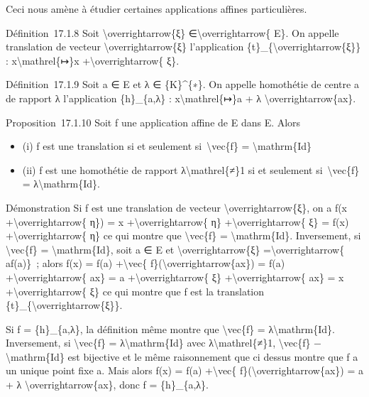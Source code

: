 \documentclass[]{article}
\begin{document}
Ceci nous amène à étudier certaines applications affines particulières.

Définition~17.1.8 Soit \textbackslash{}overrightarrow\{ξ\}
∈\textbackslash{}overrightarrow\{ E\}. On appelle translation de vecteur
\textbackslash{}overrightarrow\{ξ\} l'application
\{t\}\_\{\textbackslash{}overrightarrow\{ξ\}\} :
x\textbackslash{}mathrel\{↦\}x +\textbackslash{}overrightarrow\{ ξ\}.

Définition~17.1.9 Soit a ∈ E et λ ∈ \{K\}\^{}\{∗\}. On appelle
homothétie de centre a de rapport λ l'application \{h\}\_\{a,λ\} :
x\textbackslash{}mathrel\{↦\}a + λ \textbackslash{}overrightarrow\{ax\}.

Proposition~17.1.10 Soit f une application affine de E dans E. Alors

\begin{itemize}
\itemsep1pt\parskip0pt
\item
  (i) f est une translation si et seulement si~\textbackslash{}vec\{f\}
  = \textbackslash{}mathrm\{Id\}
\item
  (ii) f est une homothétie de rapport λ\textbackslash{}mathrel\{≠\}1 si
  et seulement si~\textbackslash{}vec\{f\} =
  λ\textbackslash{}mathrm\{Id\}.
\end{itemize}

Démonstration Si f est une translation de vecteur
\textbackslash{}overrightarrow\{ξ\}, on a f(x
+\textbackslash{}overrightarrow\{ η\}) = x
+\textbackslash{}overrightarrow\{ η\} +\textbackslash{}overrightarrow\{
ξ\} = f(x) +\textbackslash{}overrightarrow\{ η\} ce qui montre que
\textbackslash{}vec\{f\} = \textbackslash{}mathrm\{Id\}. Inversement, si
\textbackslash{}vec\{f\} = \textbackslash{}mathrm\{Id\}, soit a ∈ E et
\textbackslash{}overrightarrow\{ξ\} =\textbackslash{}overrightarrow\{
af(a)\}~; alors f(x) = f(a) +\textbackslash{}vec\{
f\}(\textbackslash{}overrightarrow\{ax\}) = f(a)
+\textbackslash{}overrightarrow\{ ax\} = a
+\textbackslash{}overrightarrow\{ ξ\} +\textbackslash{}overrightarrow\{
ax\} = x +\textbackslash{}overrightarrow\{ ξ\} ce qui montre que f est
la translation \{t\}\_\{\textbackslash{}overrightarrow\{ξ\}\}.

Si f = \{h\}\_\{a,λ\}, la définition même montre que
\textbackslash{}vec\{f\} = λ\textbackslash{}mathrm\{Id\}. Inversement,
si \textbackslash{}vec\{f\} = λ\textbackslash{}mathrm\{Id\} avec
λ\textbackslash{}mathrel\{≠\}1, \textbackslash{}vec\{f\}
−\textbackslash{}mathrm\{Id\} est bijective et le même raisonnement que
ci dessus montre que f a un unique point fixe a. Mais alors f(x) = f(a)
+\textbackslash{}vec\{ f\}(\textbackslash{}overrightarrow\{ax\}) = a + λ
\textbackslash{}overrightarrow\{ax\}, donc f = \{h\}\_\{a,λ\}.
\end{document}
